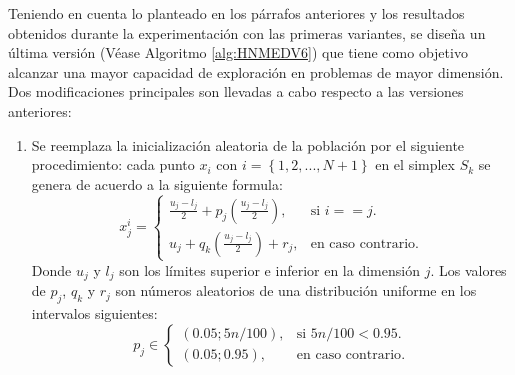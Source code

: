 Teniendo en cuenta lo planteado en los párrafos anteriores y los resultados obtenidos durante la experimentación con las primeras variantes, se diseña un última versión (Véase Algoritmo \ref{alg:HNMEDV6}) que tiene como objetivo alcanzar una mayor capacidad de exploración en problemas de mayor dimensión. Dos modificaciones principales son llevadas a cabo respecto a las versiones anteriores:
\begin{enumerate}
	\item Se reemplaza la inicialización aleatoria de la población por el siguiente procedimiento: cada punto $x_i$ con $i =\left\lbrace  1,2,...,N+1\right\rbrace $ en  el simplex $S_k$ se genera de acuerdo a la siguiente formula:
	\begin{equation}\label{eq:Inicializacion de Simpleces}
	x^i_j=\begin{cases}
	\frac{u_j-l_j}{2}+p_j(\frac{u_j-l_j}{2}), & \text{si $i==j$}.\\
	u_j+q_k(\frac{u_j-l_j}{2})+r_j, & \text{en caso contrario}.
	\end{cases}
	\end{equation}
	Donde $u_j$ y $l_j$ son los límites superior e inferior en la dimensión $j$. Los valores de  $p_j$, $q_k$ y $r_j$ son números aleatorios de una distribución uniforme en los intervalos siguientes:
	\begin{equation}
	p_j \in \begin{cases}
	(0.05;5n/100), & \text{si $5n/100 <0.95$}.\\
	(0.05;0.95), & \text{en caso contrario}.
	\end{cases}
	\end{equation}
	

\end{enumerate}
